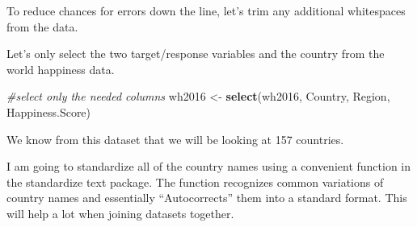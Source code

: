 \documentclass[]{article}
\newenvironment{Shaded}{\begin{snugshade}}{\end{snugshade}}
\newcommand{\CommentTok}[1]{\textcolor[rgb]{0.56,0.35,0.01}{\textit{#1}}}
\newcommand{\DataTypeTok}[1]{\textcolor[rgb]{0.13,0.29,0.53}{#1}}
\newcommand{\KeywordTok}[1]{\textcolor[rgb]{0.13,0.29,0.53}{\textbf{#1}}}
\newcommand{\NormalTok}[1]{#1}
\newcommand{\OperatorTok}[1]{\textcolor[rgb]{0.81,0.36,0.00}{\textbf{#1}}}
\newcommand{\StringTok}[1]{\textcolor[rgb]{0.31,0.60,0.02}{#1}}
\begin{document}
To reduce chances for errors down the line, let's trim any additional
whitespaces from the data.

\begin{Shaded}
\end{Shaded}

Let's only select the two target/response variables and the country from
the world happiness data.

\begin{Shaded}
\begin{Highlighting}[]
\CommentTok{#select only the needed columns }
\NormalTok{wh2016 <-}\StringTok{ }\KeywordTok{select}\NormalTok{(wh2016, Country, Region, Happiness.Score)}
\end{Highlighting}
\end{Shaded}

We know from this dataset that we will be looking at 157 countries.

I am going to standardize all of the country names using a convenient
function in the standardize text package. The function recognizes common
variations of country names and essentially ``Autocorrects'' them into a
standard format. This will help a lot when joining datasets together.

\begin{Shaded}
\end{Shaded}
\end{document}
